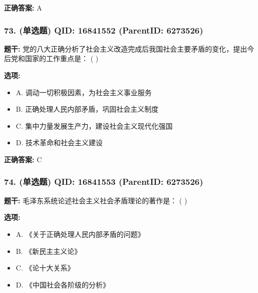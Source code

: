 \documentclass[12pt,UTF8]{ctexart}
\begin{document}
\textbf{正确答案:}
A

\vspace{0.3em}\hrulefill\vspace{0.7em}

\subsubsection*{73. (单选题) \small QID: 16841552 (ParentID: 6273526)}

\textbf{题干:}
党的八大正确分析了社会主义改造完成后我国社会主要矛盾的变化，提出今后党和国家的工作重点是： ( )



\textbf{选项:}
\begin{itemize}[leftmargin=*]

  \item A. 调动一切积极因素，为社会主义事业服务

  \item B. 正确处理人民内部矛盾，巩固社会主义制度

  \item C. 集中力量发展生产力，建设社会主义现代化强国

  \item D. 技术革命和社会主义建设

\end{itemize}

\textbf{正确答案:}
C

\vspace{0.3em}\hrulefill\vspace{0.7em}

\subsubsection*{74. (单选题) \small QID: 16841553 (ParentID: 6273526)}

\textbf{题干:}
毛泽东系统论述社会主义社会矛盾理论的著作是： ( )



\textbf{选项:}
\begin{itemize}[leftmargin=*]

  \item A. 《关于正确处理人民内部矛盾的问题》

  \item B. 《新民主主义论》

  \item C. 《论十大关系》

  \item D. 《中国社会各阶级的分析》

\end{itemize}
\end{document}

